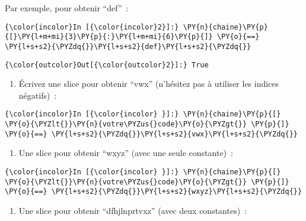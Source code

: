     Par exemple, pour obtenir ``def''~:

    \begin{Verbatim}[commandchars=\\\{\}]
{\color{incolor}In [{\color{incolor}2}]:} \PY{n}{chaine}\PY{p}{[}\PY{l+m+mi}{3}\PY{p}{:}\PY{l+m+mi}{6}\PY{p}{]} \PY{o}{==} \PY{l+s+s2}{\PYZdq{}}\PY{l+s+s2}{def}\PY{l+s+s2}{\PYZdq{}}
\end{Verbatim}


\begin{Verbatim}[commandchars=\\\{\}]
{\color{outcolor}Out[{\color{outcolor}2}]:} True
\end{Verbatim}
            
    \begin{enumerate}
\def\labelenumi{\arabic{enumi})}
\tightlist
\item
  Écrivez une slice pour obtenir ``vwx'' (n'hésitez pas à utiliser les
  indices négatifs)~:
\end{enumerate}

    \begin{Verbatim}[commandchars=\\\{\}]
{\color{incolor}In [{\color{incolor} }]:} \PY{n}{chaine}\PY{p}{[} \PY{o}{\PYZlt{}}\PY{n}{votre\PYZus{}code}\PY{o}{\PYZgt{}} \PY{p}{]} \PY{o}{==} \PY{l+s+s2}{\PYZdq{}}\PY{l+s+s2}{vwx}\PY{l+s+s2}{\PYZdq{}}
\end{Verbatim}


    \begin{enumerate}
\def\labelenumi{\arabic{enumi})}
\setcounter{enumi}{1}
\tightlist
\item
  Une slice pour obtenir ``wxyz'' (avec une seule constante)~:
\end{enumerate}

    \begin{Verbatim}[commandchars=\\\{\}]
{\color{incolor}In [{\color{incolor} }]:} \PY{n}{chaine}\PY{p}{[} \PY{o}{\PYZlt{}}\PY{n}{votre\PYZus{}code}\PY{o}{\PYZgt{}} \PY{p}{]} \PY{o}{==} \PY{l+s+s2}{\PYZdq{}}\PY{l+s+s2}{wxyz}\PY{l+s+s2}{\PYZdq{}}
\end{Verbatim}


    \begin{enumerate}
\def\labelenumi{\arabic{enumi})}
\setcounter{enumi}{2}
\tightlist
\item
  Une slice pour obtenir ``dfhjlnprtvxz'' (avec deux constantes)~:
\end{enumerate}

